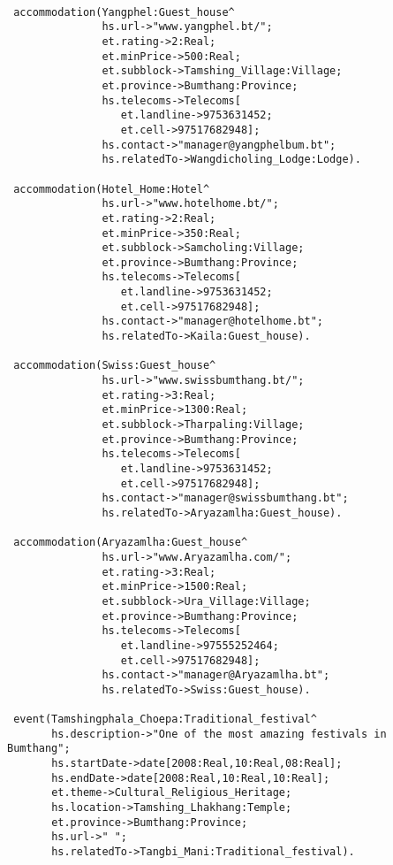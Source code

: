 \begin{verbatim}
                  
 accommodation(Yangphel:Guest_house^
               hs.url->"www.yangphel.bt/";
               et.rating->2:Real;
               et.minPrice->500:Real;
               et.subblock->Tamshing_Village:Village;
               et.province->Bumthang:Province;
               hs.telecoms->Telecoms[
                  et.landline->9753631452;
                  et.cell->97517682948];
               hs.contact->"manager@yangphelbum.bt";
               hs.relatedTo->Wangdicholing_Lodge:Lodge).   

 accommodation(Hotel_Home:Hotel^
               hs.url->"www.hotelhome.bt/";
               et.rating->2:Real;
               et.minPrice->350:Real;
               et.subblock->Samcholing:Village;
               et.province->Bumthang:Province;
               hs.telecoms->Telecoms[
                  et.landline->9753631452;
                  et.cell->97517682948];
               hs.contact->"manager@hotelhome.bt";
               hs.relatedTo->Kaila:Guest_house).                  
                  
 accommodation(Swiss:Guest_house^
               hs.url->"www.swissbumthang.bt/";
               et.rating->3:Real;
               et.minPrice->1300:Real;
               et.subblock->Tharpaling:Village;
               et.province->Bumthang:Province;
               hs.telecoms->Telecoms[
                  et.landline->9753631452;
                  et.cell->97517682948];
               hs.contact->"manager@swissbumthang.bt";
               hs.relatedTo->Aryazamlha:Guest_house).   
          
 accommodation(Aryazamlha:Guest_house^
               hs.url->"www.Aryazamlha.com/";
               et.rating->3:Real;
               et.minPrice->1500:Real;
               et.subblock->Ura_Village:Village;
               et.province->Bumthang:Province;
               hs.telecoms->Telecoms[
                  et.landline->97555252464;
                  et.cell->97517682948];
               hs.contact->"manager@Aryazamlha.bt";
               hs.relatedTo->Swiss:Guest_house).     
                  
 event(Tamshingphala_Choepa:Traditional_festival^
       hs.description->"One of the most amazing festivals in Bumthang";
       hs.startDate->date[2008:Real,10:Real,08:Real];
       hs.endDate->date[2008:Real,10:Real,10:Real];
       et.theme->Cultural_Religious_Heritage;
       hs.location->Tamshing_Lhakhang:Temple;
       et.province->Bumthang:Province;
       hs.url->" ";
       hs.relatedTo->Tangbi_Mani:Traditional_festival).


\end{verbatim}
